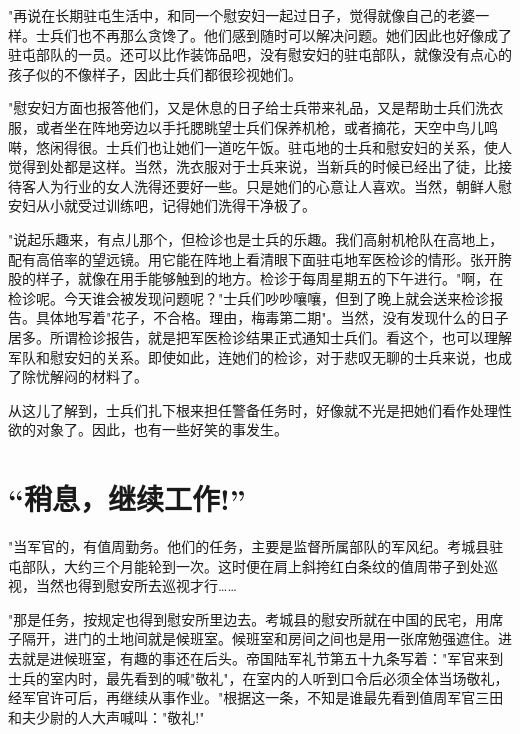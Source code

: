 \documentclass[12pt,UTF8]{ctexbook}
\begin{document}
"再说在长期驻屯生活中，和同一个慰安妇一起过日子，觉得就像自己的老婆一样。士兵们也不再那么贪馋了。他们感到随时可以解决问题。她们因此也好像成了驻屯部队的一员。还可以比作装饰品吧，没有慰安妇的驻屯部队，就像没有点心的孩子似的不像样子，因此士兵们都很珍视她们。



"慰安妇方面也报答他们，又是休息的日子给士兵带来礼品，又是帮助士兵们洗衣服，或者坐在阵地旁边以手托腮眺望士兵们保养机枪，或者摘花，天空中鸟儿鸣啭，悠闲得很。士兵们也让她们一道吃午饭。驻屯地的士兵和慰安妇的关系，使人觉得到处都是这样。当然，洗衣服对于士兵来说，当新兵的时候已经出了徒，比接待客人为行业的女人洗得还要好一些。只是她们的心意让人喜欢。当然，朝鲜人慰安妇从小就受过训练吧，记得她们洗得干净极了。



"说起乐趣来，有点儿那个，但检诊也是士兵的乐趣。我们高射机枪队在高地上，配有高倍率的望远镜。用它能在阵地上看清眼下面驻屯地军医检诊的情形。张开胯股的样子，就像在用手能够触到的地方。检诊于每周星期五的下午进行。"啊，在检诊呢。今天谁会被发现问题呢？"士兵们吵吵嚷嚷，但到了晚上就会送来检诊报告。具体地写着"花子，不合格。理由，梅毒第二期"。当然，没有发现什么的日子居多。所谓检诊报告，就是把军医检诊结果正式通知士兵们。看这个，也可以理解军队和慰安妇的关系。即使如此，连她们的检诊，对于悲叹无聊的士兵来说，也成了除忧解闷的材料了。



从这儿了解到，士兵们扎下根来担任警备任务时，好像就不光是把她们看作处理性欲的对象了。因此，也有一些好笑的事发生。






\section{“稍息，继续工作!”}



"当军官的，有值周勤务。他们的任务，主要是监督所属部队的军风纪。考城县驻屯部队，大约三个月能轮到一次。这时便在肩上斜挎红白条纹的值周带子到处巡视，当然也得到慰安所去巡视才行……



"那是任务，按规定也得到慰安所里边去。考城县的慰安所就在中国的民宅，用席子隔开，进门的土地间就是候班室。候班室和房间之间也是用一张席勉强遮住。进去就是进候班室，有趣的事还在后头。帝国陆军礼节第五十九条写着："军官来到士兵的室内时，最先看到的喊"敬礼"，在室内的人听到口令后必须全体当场敬礼，经军官许可后，再继续从事作业。"根据这一条，不知是谁最先看到值周军官三田和夫少尉的人大声喊叫："敬礼!"
\end{document}
